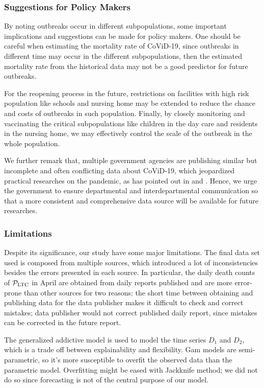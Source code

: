 \documentclass[12pt]{article}
\begin{document}
\subsubsection{Suggestions for Policy Makers}
By noting outbreaks occur in different subpopulations, some important implications and suggestions can be made for policy makers.
One should be careful when estimating the mortality rate of CoViD-19, since outbreaks in different time may occur
in the different subpopulations, then the estimated mortality rate from the historical data may not be a good predictor for future outbreaks.

For the reopening process in the future, restrictions on facilities with high risk population like schools and nursing home may be extended to reduce the chance and costs of outbreaks in such population. Finally, by closely monitoring and vaccinating the critical subpopulations like children in the day care and residents in the nursing home, we may effectively control the scale of the outbreak in the whole population. 
 
 We further remark that, multiple government agencies are publishing similar but incomplete and often conflicting data about CoViD-19, which jeopardized practical researches on the pandemic, as has pointed out in \cite{liu2020covid} and \cite{hsu2020understanding}. Hence, we urge the government to ensure departmental and interdepartmental communication so that a more consistent and comprehensive data source will be available for future researches.


\subsubsection{Limitations}
Despite its significance, our study have some major limitations. 
The final data set used is composed from multiple sources, which introduced a lot of inconsistencies besides the errors presented in each source. In particular,
the daily death counts of $\mathcal P_{\mathrm{LTC}}$ in April are obtained from daily reports \cite{cite2} published and are more error-prone than other sources for two reasons: the short time between obtaining and publishing data for the data publisher makes it difficult to check and correct mistakes; data publisher would not correct published daily report, since mistakes can be corrected in the future report.


The generalized addictive model is used to model the time series $D_1$ and $D_2$, which is a trade off between explainability and flexibility.  
Gam models are semi-parametric, so it's more susceptible to overfit the observed data than the parametric model. Overfitting might be eased with Jackknife method; we did not do so since forecasting is not of the central purpose of our model. 
\end{document}
